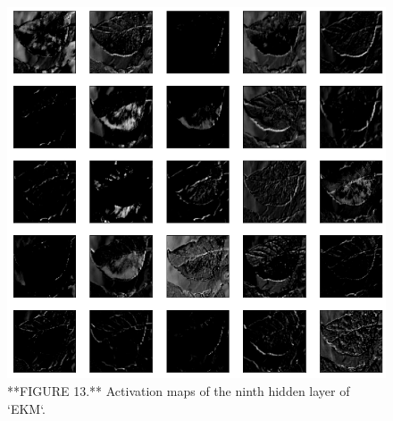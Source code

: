 \documentclass{acm_proc_article-sp}
\begin{document}
\begin{figure}

{\centering \includegraphics[width=9.5in]{Images/FeatureMaps9} 

}

\caption{**FIGURE 13.** Activation maps of the ninth hidden layer of `EKM`.}\label{fig:maps9}
\end{figure}
\setlength{\parindent}{0in}
\end{document}

